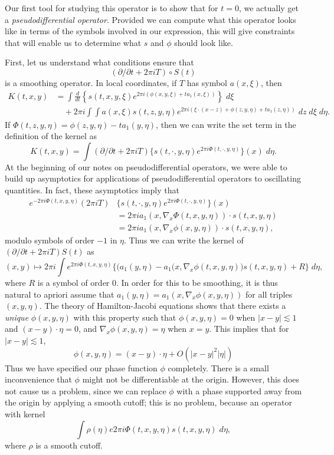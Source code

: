 Our first tool for studying this operator is to show that for $t = 0$, we actually get a \emph{pseudodifferential operator}. Provided we can compute what this operator looks like in terms of the symbols involved in our expression, this will give constraints that will enable us to determine what $s$ and $\phi$ should look like.

First, let us understand what conditions ensure that
%
\[ (\partial / \partial t + 2 \pi i T) \circ S(t) \]
%
is a smoothing operator. In local coordinates, if $T$ has symbol $a(x,\xi)$, then
%
\begin{align*}
    K(t,x,y) &= \int \frac{d}{dt} \left\{ s(t,x,y,\xi) e^{2 \pi i (\phi(x,y,\xi) + t a_1(x,\xi))} \right\}\; d\xi\\
    &\quad + 2 \pi i \int \int a(x,\xi) s(t,z,y,\eta) e^{2 \pi i ( \xi \cdot (x - z) + \phi(z,y,\eta) + t a_1(z,\eta))}\; dz\; d\xi\; d\eta.
\end{align*}
%
If $\Phi(t,z,y,\eta) = \phi(z,y,\eta) - t a_1(y,\eta)$, then we can write the set term in the definition of the kernel as
%
\[ K(t,x,y) = \int (\partial / \partial t + 2 \pi i T) \{ s(t,\cdot,y,\eta) e^{2 \pi i \Phi(t,\cdot, y, \eta)} \}(x)\; d\eta. \]
%
At the beginning of our notes on pseudodifferential operators, we were able to build up asymptotics for applications of pseudodifferential operators to oscillating quantities. In fact, these asymptotics imply that
%
\begin{align*}
    e^{-2 \pi i \Phi(t,x,y,\eta)} (2 \pi i T) & \{ s(t,\cdot,y,\eta) e^{2 \pi i \Phi(t,\cdot, y, \eta)} \}(x)\\
    &= 2 \pi i a_1(x, \nabla_x \Phi(t,x,y,\eta)) \cdot s(t,x,y,\eta)\\
    &= 2 \pi i a_1(x, \nabla_x \phi(x,y,\eta)) \cdot s(t,x,y,\eta),
\end{align*}
%
modulo symbols of order $-1$ in $\eta$. Thus we can write the kernel of $(\partial / \partial t + 2 \pi i T) S(t)$ as
%
\[ (x,y) \mapsto 2 \pi i \int e^{2 \pi i \Phi(t,x,y,\eta)} \Bigg\{ \Big( a_1(y,\eta) - a_1(x, \nabla_x \phi(t,x,y,\eta) \Big) s(t,x,y,\eta) + R \Bigg\} \; d\eta, \]
%
where $R$ is a symbol of order $0$. In order for this to be smoothing, it is thus natural to apriori assume that $a_1(y,\eta) = a_1(x,\nabla_x \phi(x,y,\eta))$ for all triples $(x,y,\eta)$. The theory of Hamilton-Jacobi equations shows that there exists a \emph{unique} $\phi(x,y,\eta)$ with this property such that $\phi(x,y,\eta) = 0$ when $|x - y| \lesssim 1$ and $(x - y) \cdot \eta = 0$, and $\nabla_x \phi(x,y,\eta) = \eta$ when $x = y$. This implies that for $|x - y| \lesssim 1$,
%
\[ \phi(x,y,\eta) = (x - y) \cdot \eta + O( |x - y|^2 |\eta| ) \]
%
Thus we have specified our phase function $\phi$ completely. There is a small inconvenience that $\phi$ might not be differentiable at the origin. However, this does not cause us a problem, since we can replace $\phi$ with a phase supported away from the origin by applying a smooth cutoff; this is no problem, because an operator with kernel
%
\[ \int \rho(\eta) e{2 \pi i \Phi(t,x,y,\eta)} s(t,x,y,\eta)\; d\eta, \]
%
where $\rho$ is a smooth cutoff.


